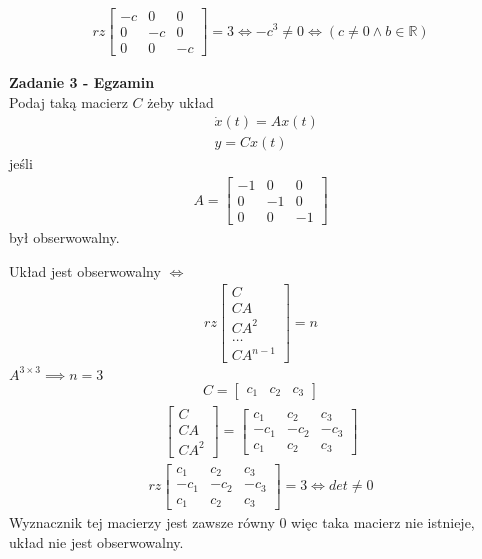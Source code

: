 \documentclass[a4paper,11pt]{article}
\begin{document}
\begin{align*}
rz
\begin{bmatrix}
-c & 0 & 0 \\
0 & -c & 0 \\
0 & 0 & -c
\end{bmatrix}
= 3
\Longleftrightarrow
-c^{3} \neq 0 \Longleftrightarrow (c \neq 0 \land b \in \mathbb{R})
\end{align*}

\newpage
\begin{framed}
\textbf{Zadanie 3 - Egzamin } \\ 
Podaj taką macierz \( C \) żeby układ 
\begin{align*}
&\dot{x}(t)=Ax(t) \\
&y=Cx(t)
\end{align*}
jeśli
\begin{align*}
A = 
\begin{bmatrix}
-1 & 0 & 0 \\
0 & -1 & 0 \\
0 & 0 & -1 
\end{bmatrix}
\end{align*}
był obserwowalny.
\end{framed}
Układ jest obserwowalny \( \Longleftrightarrow \) 
\begin{align*}
rz \begin{bmatrix}
C \\
CA \\
CA^{2} \\
\dots \\
CA^{n-1}
\end{bmatrix}
= n
\end{align*}
\(A^{3\times 3} \implies n = 3\)
\begin{align*}
C =
\begin{bmatrix}
c_{1} & c_{2} & c_{3}
\end{bmatrix}
\end{align*}
\begin{align*}
\begin{bmatrix}
C \\
CA \\
CA^{2} 
\end{bmatrix}
=
\begin{bmatrix}
c_{1} & c_{2} & c_{3} \\
-c_{1} & -c_{2} & -c_{3} \\
c_{1} & c_{2} & c_{3}
\end{bmatrix}
\end{align*}
\begin{align*}
rz
\begin{bmatrix}
c_{1} & c_{2} & c_{3} \\
-c_{1} & -c_{2} & -c_{3} \\
c_{1} & c_{2} & c_{3}
\end{bmatrix}
= 3
\Longleftrightarrow
det \neq 0
\end{align*}
Wyznacznik tej macierzy jest zawsze równy \( 0 \) więc taka macierz nie istnieje, układ nie jest obserwowalny.
\end{document}
